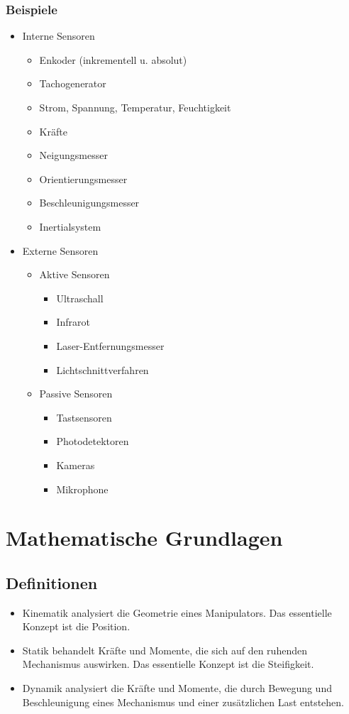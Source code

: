 \documentclass[paper=a4, fontsize=11pt]{scrartcl} %
\numberwithin{equation}{section} %
\numberwithin{figure}{section} %
\numberwithin{table}{section} %
\begin{document}
\subsubsection{Beispiele}

\begin{itemize}
\item Interne Sensoren
\begin{itemize}
\item Enkoder (inkrementell u. absolut)
\item Tachogenerator
\item Strom, Spannung, Temperatur, Feuchtigkeit
\item Kräfte
\item Neigungsmesser
\item Orientierungsmesser
\item Beschleunigungsmesser
\item Inertialsystem
\end{itemize}
\item Externe Sensoren
\begin{itemize}
\item Aktive Sensoren
\begin{itemize}
\item Ultraschall
\item Infrarot
\item Laser-Entfernungsmesser
\item Lichtschnittverfahren
\end{itemize}
\item Passive Sensoren
\begin{itemize}
\item Tastsensoren
\item Photodetektoren
\item Kameras
\item Mikrophone
\end{itemize}
\end{itemize}
\end{itemize}

\section{Mathematische Grundlagen}

\subsection{Definitionen}

\begin{itemize}
\item Kinematik analysiert die Geometrie eines Manipulators. Das essentielle Konzept ist die Position.
\item Statik behandelt Kräfte und Momente, die sich auf den ruhenden Mechanismus auswirken. Das essentielle Konzept ist die Steifigkeit.
\item Dynamik analysiert die Kräfte und Momente, die durch Bewegung und Beschleunigung eines Mechanismus und einer zusätzlichen Last entstehen.
\end{itemize}
\end{document}
